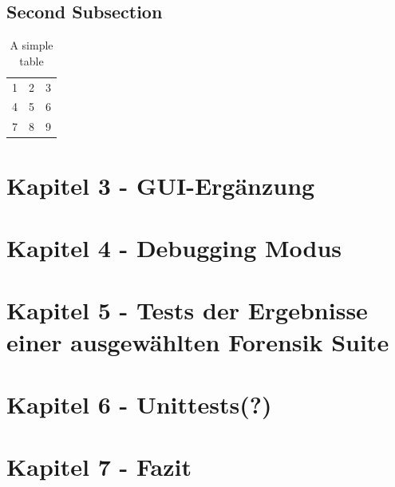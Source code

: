 \documentclass[12pt]{article}
\begin{document}
\subsection{Second Subsection}
\lipsum[4]
\begin{table}
	\centering
	\begin{tabular}{| l c r |}
		\hline
		1 & 2 & 3 \\
		4 & 5 & 6 \\
		7 & 8 & 9 \\
		\hline
	\end{tabular}
	\caption{A simple table}
\end{table}
\lipsum[2]
\cleardoublepage

\section{Kapitel 3 - GUI-Ergänzung}
\lipsum[3]
\cleardoublepage

\section{Kapitel 4 - Debugging Modus}
\lipsum[3]
\cleardoublepage

\section{Kapitel 5 - Tests der Ergebnisse einer ausgewählten Forensik Suite}
\lipsum[3]
\cleardoublepage

\section{Kapitel 6 - Unittests(?)}
\lipsum[3]
\cleardoublepage

\section{Kapitel 7 - Fazit}
\lipsum[9]
\lipsum[8]
\lipsum[8]
\lipsum[3]
\end{document}
